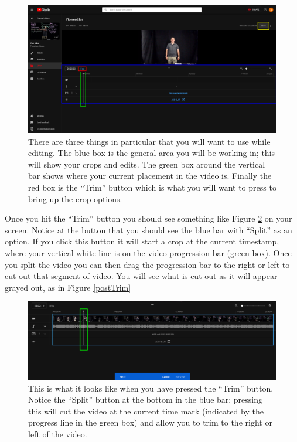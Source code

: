 \documentclass{article}
\begin{document}
        \begin{figure}[h]
            \includegraphics[width=\textwidth]{editingPage.png}
            \caption{There are three things in particular that you will want to use while editing. The blue box is the general area you will be working in; this will show your crops and edits. The green box around the vertical bar shows where your current placement in the video is. Finally the red box is the ``Trim'' button which is what you will want to press to bring up the crop options.}
            \label{editingPage}
        \end{figure}
        
        \newpage
        
        Once you hit the ``Trim'' button you should see something like Figure \ref{trimPage} on your screen. Notice at the button that you should see the blue bar with ``Split'' as an option. If you click this button it will start a crop at the current timestamp, where your vertical white line is on the video progression bar (green box). Once you split the video you can then drag the progression bar to the right or left to cut out that segment of video. You will see what is cut out as it will appear grayed out, as in Figure \ref{postTrim}
    
        \begin{figure}[h]
            \includegraphics[width=\textwidth]{trimPage.png}
            \caption{This is what it looks like when you have pressed the ``Trim'' button. Notice the ``Split'' button at the bottom in the blue bar; pressing this will cut the video at the current time mark (indicated by the progress line in the green box) and allow you to trim to the right or left of the video.}
            \label{trimPage}
        \end{figure}
        
\end{document}
